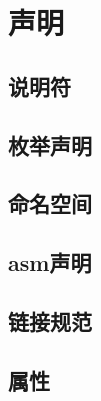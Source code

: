 
\chapter{声明}

\section{说明符}
\section{枚举声明}
\section{命名空间}
\section{asm声明}
\section{链接规范}
\section{属性}

